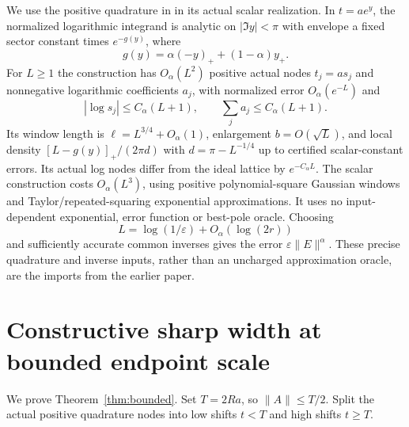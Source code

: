 \documentclass[11pt]{article}
\numberwithin{equation}{section}
\begin{document}
We use the positive quadrature in \cite[Lemma~5.1]{Raw} in its actual
scalar realization. In $t=ae^y$, the normalized logarithmic integrand
is analytic on $|\Im y|<\pi$ with envelope a fixed sector constant
times $e^{-g(y)}$, where
\begin{equation}\label{eq:g}
 g(y)=\alpha(-y)_++(1-\alpha)y_+.
\end{equation}
For $L\ge1$ the construction has $O_\alpha(L^2)$ positive actual
nodes $t_j=as_j$ and nonnegative logarithmic coefficients $a_j$,
with normalized error $O_\alpha(e^{-L})$ and
\begin{equation}\label{eq:quadrature-properties}
 |\log s_j|\le C_\alpha(L+1),\qquad
 \sum_j a_j\le C_\alpha(L+1).
\end{equation}
Its window length is $\ell=L^{3/4}+O_\alpha(1)$, enlargement
$b=O(\sqrt L)$, and local density
$[L-g(y)]_+/(2\pi d)$ with $d=\pi-L^{-1/4}$ up to certified
scalar-constant errors. Its actual log nodes differ from the ideal
lattice by $e^{-C_\alpha L}$. The scalar construction costs
$O_\alpha(L^3)$, using positive polynomial-square Gaussian windows
and Taylor/repeated-squaring exponential approximations. It uses no
input-dependent exponential, error function or best-pole oracle.
Choosing
\begin{equation}\label{eq:Lchoose}
 L=\log(1/\varepsilon)+O_\alpha(\log(2r))
\end{equation}
and sufficiently accurate common inverses gives the error
$\varepsilon\|E\|^\alpha$. These precise quadrature and inverse
inputs, rather than an uncharged approximation oracle, are the
imports from the earlier paper.

\section{Constructive sharp width at bounded endpoint scale}

We prove Theorem~\ref{thm:bounded}. Set $T=2Ra$, so
$\|A\|\le T/2$. Split the actual positive quadrature nodes into
low shifts $t<T$ and high shifts $t\ge T$.
\end{document}
